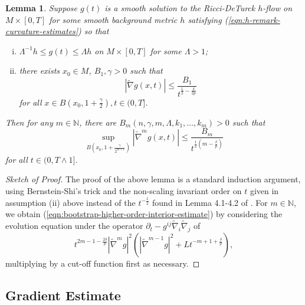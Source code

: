 \documentclass[12pt]{amsart}
\theoremstyle{plain}
\theoremstyle{plain}
\newtheorem{lemma}[subsection]{Lemma}
\theoremstyle{definition}
\theoremstyle{remark}
\numberwithin{equation}{subsection}
\newcommand{\hdel}{\tilde{\nabla}}
\begin{document}
\begin{lemma}\label{lem:estimates-bootstrap}
    Suppose $g(t)$ is a smooth solution to the Ricci-DeTurck $h$-flow on $M \times [0,T]$ for some smooth background metric $h$ satisfying (\ref{eqn:h-remark-curvature-estimates}) %
    so that
    \begin{enumerate}[(i)]
        \item $\Lambda^{-1}h \leq g(t) \leq \Lambda h$ on $M\times[0,T]$ for some $\Lambda > 1$;
        \item there exists $x_0\in M$, $B_1,\gamma>0$ such that 
        \begin{equation*}
            |\hdel g(x,t)| \leq \frac{B_1}{t^{\frac{1}{2}-\frac{\delta}{2p}}}
        \end{equation*}
        for all $x \in B\left(x_0, 1 + \frac{\gamma}{2}\right), t \in (0, T]$. 
    \end{enumerate}
 Then for any $m\in \mathbb{N}$, there are 
       $ B_m(n,\gamma, m,\Lambda,k_1,\dots,k_m) > 0$
    such that 
    \begin{equation}\label{eqn:bootstrap-higher-order-interior-estimate}
        \sup\limits_{B\left(x_0, 1 + \frac{\gamma}{2^{m+1}}\right)} |\hdel^m g(x,t)| \leq \frac{B_m}{t^{\frac{1}{2}(m-\frac{\delta}{p})}}
    \end{equation}
    for all $t \in (0, T\wedge 1]$. %
\end{lemma}

\begin{proof}[Sketch of Proof]
    The proof of the above lemma is a standard induction argument, using Bernstein-Shi's trick and the non-scaling invariant order on $t$ given in assumption (ii) above instead of the $t^{-\frac{1}{2}}$ found in Lemma 4.1-4.2 of \cite{simon_deformation_2002}. For $m \in \mathbb{N}$, we obtain (\ref{eqn:bootstrap-higher-order-interior-estimate}) by considering the evolution equation under the operator $\partial_t - g^{ij}\hdel_i\hdel_j$ of 
    \begin{equation*}
        t^{2m-1-\frac{2\delta}{p}}|\hdel^m g|^2\left(|\hdel^{m-1}g|^2 + Lt^{-m+1+\frac{\delta}{p}}\right),
    \end{equation*}
    multiplying by a cut-off function first as necessary.
\end{proof}


\subsection{Gradient Estimate}
\end{document}
